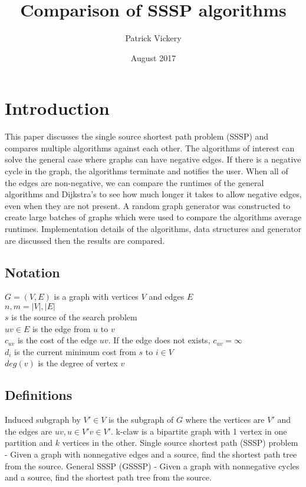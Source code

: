 \documentclass{article}
\title{Comparison of SSSP algorithms}
\author{Patrick Vickery }
\date{August 2017}
\begin{document}
\maketitle

\section{Introduction}
This paper discusses the single source shortest path problem (SSSP) and compares multiple algorithms against each other. The algorithms of interest can solve the general case where graphs can have negative edges. If there is a negative cycle in the graph, the algorithms terminate and notifies the user. When all of the edges are non-negative, we can compare the runtimes of the general algorithms and Dijkstra's to see how much longer it takes to allow negative edges, even when they are not present. A random graph generator was constructed to create large batches of graphs which were used to compare the algorithms average runtimes. Implementation details of the algorithms, data structures and generator are discussed then the results are compared.

\subsection{Notation}
$G=(V,E)$ is a graph with vertices $V$ and edges $E$\\
$n,m = \lvert V \rvert, \lvert E \rvert$\\
$s$ is the source of the search problem\\
$uv\in E$ is the edge from $u$ to $v$\\
$c_{uv}$ is the cost of the edge $uv$. If the edge does not exists, $c_{uv}= \infty$\\
$d_i$ is the current minimum cost from $s$ to $i \in V$\\
$deg(v)$ is the degree of vertex $v$\\

\subsection{Definitions}
Induced subgraph by $V' \in V$ is the subgraph of $G$ where the vertices are $V'$ and the edges are $uv, u\in V' v\in V'$.
k-claw is a bipartite graph with 1 vertex in one partition and $k$ vertices in the other.
Single source shortest path (SSSP) problem - Given a graph with nonnegative edges and a source, find the shortest path tree from the source.
General SSSP (GSSSP) - Given a graph with nonnegative cycles and a source, find the shortest path tree from the source.
\end{document}
